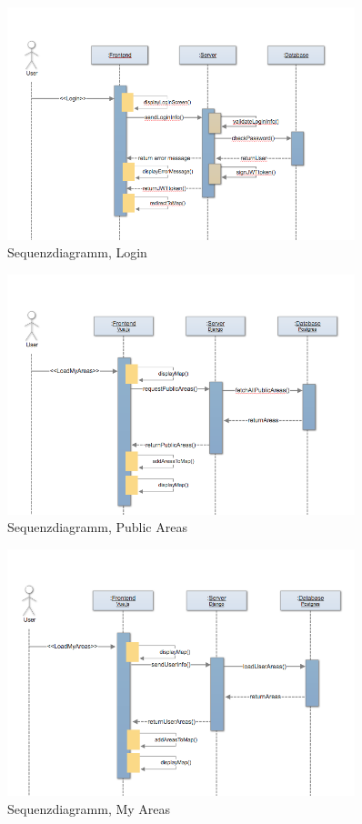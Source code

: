 \begin{figure}[H]
\centering
    \includegraphics[width=0.9\textwidth]{Sequenz_DiagrammLogin}
    \caption{Sequenzdiagramm, Login}
    \label{fig:sd2}
\end{figure}

\begin{figure}[H]
\centering
    \includegraphics[width=0.9\textwidth]{Sequenz_DiagrammPublicAreas}
    \caption{Sequenzdiagramm, Public Areas}
    \label{fig:sd3}
\end{figure}

\begin{figure}[H]
\centering
    \includegraphics[width=0.9\textwidth]{Sequenz_DiagrammMyAreas}
    \caption{Sequenzdiagramm, My Areas}
    \label{fig:sd4}
\end{figure}

